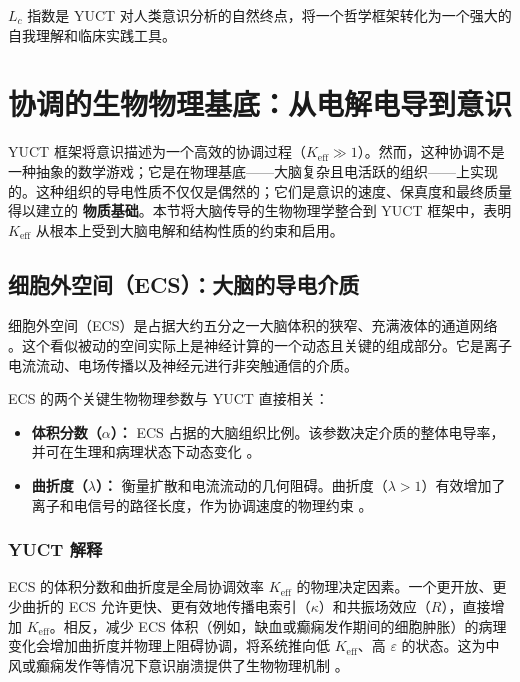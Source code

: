 \documentclass[12pt,a4paper]{article}
\begin{document}
	\(L_c\) 指数是 YUCT 对人类意识分析的自然终点，将一个哲学框架转化为一个强大的自我理解和临床实践工具。
	
	\section{协调的生物物理基底：从电解电导到意识}
	
	YUCT 框架将意识描述为一个高效的协调过程（\(K_{\mathrm{eff}} \gg 1\)）。然而，这种协调不是一种抽象的数学游戏；它是在物理基底——大脑复杂且电活跃的组织——上实现的。这种组织的导电性质不仅仅是偶然的；它们是意识的速度、保真度和最终质量得以建立的 \textbf{物质基础}。本节将大脑传导的生物物理学整合到 YUCT 框架中，表明 \(K_{\mathrm{eff}}\) 从根本上受到大脑电解和结构性质的约束和启用。
	
	\subsection{细胞外空间（ECS）：大脑的导电介质}
	
	细胞外空间（ECS）是占据大约五分之一大脑体积的狭窄、充满液体的通道网络 \cite{Nicholson2006}。这个看似被动的空间实际上是神经计算的一个动态且关键的组成部分。它是离子电流流动、电场传播以及神经元进行非突触通信的介质。
	
	ECS 的两个关键生物物理参数与 YUCT 直接相关：
	
	\begin{itemize}
		\item \textbf{体积分数（\(\alpha\)）：} ECS 占据的大脑组织比例。该参数决定介质的整体电导率，并可在生理和病理状态下动态变化 \cite{Sykova2008}。
		\item \textbf{曲折度（\(\lambda\)）：} 衡量扩散和电流流动的几何阻碍。曲折度（\(\lambda > 1\)）有效增加了离子和电信号的路径长度，作为协调速度的物理约束 \cite{Nicholson2006}。
	\end{itemize}
	
	\subsubsection*{YUCT 解释}
	ECS 的体积分数和曲折度是全局协调效率 \(K_{\mathrm{eff}}\) 的物理决定因素。一个更开放、更少曲折的 ECS 允许更快、更有效地传播电索引（\(\kappa\)）和共振场效应（\(R\)），直接增加 \(K_{\mathrm{eff}}\)。相反，减少 ECS 体积（例如，缺血或癫痫发作期间的细胞肿胀）的病理变化会增加曲折度并物理上阻碍协调，将系统推向低 \(K_{\mathrm{eff}}\)、高 \(\varepsilon\) 的状态。这为中风或癫痫发作等情况下意识崩溃提供了生物物理机制 \cite{Arranz2023}。
	
\end{document}
